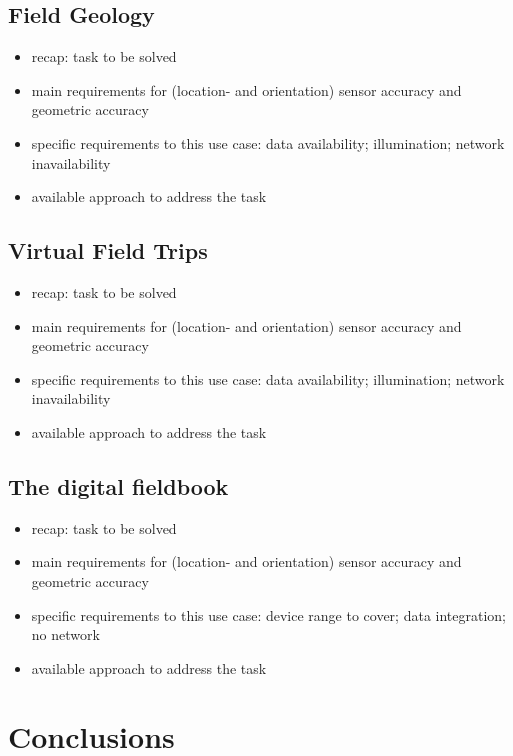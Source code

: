\documentclass[review]{elsarticle}
\begin{document}
\subsection{Field Geology}

\begin{itemize}
\item recap: task to be solved
\item main requirements for (location- and orientation) sensor accuracy and geometric accuracy
\item specific requirements to this use case: data availability; illumination; network inavailability
\item available approach to address the task
\end{itemize}

\subsection{Virtual Field Trips}

\begin{itemize}
\item recap: task to be solved
\item main requirements for (location- and orientation) sensor accuracy and geometric accuracy
\item specific requirements to this use case: data availability; illumination; network inavailability
\item available approach to address the task
\end{itemize}

\subsection{The digital fieldbook}

\begin{itemize}
\item recap: task to be solved
\item main requirements for (location- and orientation) sensor accuracy and geometric accuracy
\item specific requirements to this use case: device range to cover; data integration; no network
\item available approach to address the task
\end{itemize}


\section{Conclusions}
\label{sec:conclusions}
\end{document}
